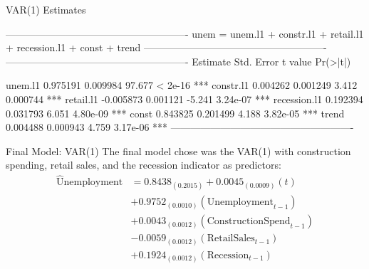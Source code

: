 \documentclass[ignorenonframetext]{beamer}
\begin{document}
    \begin{frame}[fragile]{VAR(1) Estimates}
\begin{verbnobox}[\small]
-------------------------------------------------------
unem = unem.l1 + constr.l1 + retail.l1 + recession.l1 
		+ const + trend 
-------------------------------------------------------
-------------------------------------------------------
          Estimate Std. Error t value Pr(>|t|)    

unem.l1       0.975191   0.009984  97.677  < 2e-16 ***
constr.l1     0.004262   0.001249   3.412 0.000744 ***
retail.l1    -0.005873   0.001121  -5.241 3.24e-07 ***
recession.l1  0.192394   0.031793   6.051 4.80e-09 ***
const         0.843825   0.201499   4.188 3.82e-05 ***
trend         0.004488   0.000943   4.759 3.17e-06 ***
-------------------------------------------------------
\end{verbnobox}
\end{frame}
 
 
 
  	\begin{frame}{Final Model: VAR(1)}
  		 The final model chose was the VAR(1) with construction spending, retail sales, and the recession indicator as predictors:
  \begin{align*}
  \widehat{\text{U}}\text{nemployment} &= 0.8438_{(0.2015)} +
  0.0045_{(0.0009)}(t)\\ 		
  &+ 0.9752_{(0.0010)}(\text{Unemployment}_{t-1})\\
  &+ 0.0043_{(0.0012)}(\text{ConstructionSpend}_{t-1})\\
  &- 0.0059_{(0.0012)}(\text{RetailSales}_{t-1})\\
  &+ 0.1924_{(0.0012)}(\text{Recession}_{t-1})
  \end{align*}
  	\end{frame}
\end{document}
